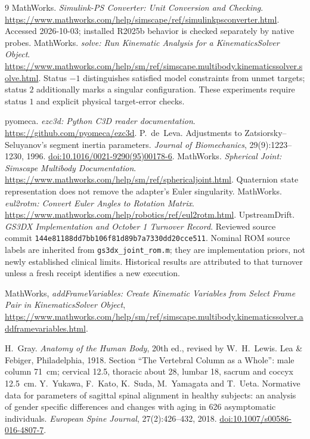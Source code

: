 \documentclass[11pt,a4paper]{article}
\begin{document}
\begin{thebibliography}{9}
MathWorks. \emph{Simulink-PS Converter: Unit Conversion and Checking}.
\url{https://www.mathworks.com/help/simscape/ref/simulinkpsconverter.html}.
Accessed 2026-10-03; installed R2025b behavior is checked separately by native probes.
MathWorks. \emph{solve: Run Kinematic Analysis for a KinematicsSolver Object}.
\url{https://www.mathworks.com/help/sm/ref/simscape.multibody.kinematicssolver.solve.html}.
Status $-1$ distinguishes satisfied model constraints from unmet targets;
status $2$ additionally marks a singular configuration. These experiments
require status $1$ and explicit physical target-error checks.

pyomeca. \emph{ezc3d: Python C3D reader documentation}.
\url{https://github.com/pyomeca/ezc3d}.
P.~de~Leva. Adjustments to Zatsiorsky--Seluyanov's segment inertia parameters.
\emph{Journal of Biomechanics}, 29(9):1223--1230, 1996.
\href{https://doi.org/10.1016/0021-9290(95)00178-6}{doi:10.1016/0021-9290(95)00178-6}.
MathWorks. \emph{Spherical Joint: Simscape Multibody Documentation}.
\url{https://www.mathworks.com/help/sm/ref/sphericaljoint.html}.
Quaternion state representation does not remove the adapter's Euler singularity.
MathWorks. \emph{eul2rotm: Convert Euler Angles to Rotation Matrix}.
\url{https://www.mathworks.com/help/robotics/ref/eul2rotm.html}.
UpstreamDrift. \emph{GS3DX Implementation and October 1 Turnover Record}.
Reviewed source commit \texttt{144e81188dd7bb106f81d89b7a7330dd20cce511}.
Nominal ROM source labels are inherited from \texttt{gs3dx\_joint\_rom.m};
they are implementation priors, not newly established clinical limits.
Historical results are attributed to that turnover unless a fresh receipt
identifies a new execution.

MathWorks, \emph{addFrameVariables: Create Kinematic Variables from Select
Frame Pair in KinematicsSolver Object},
\url{https://www.mathworks.com/help/sm/ref/simscape.multibody.kinematicssolver.addframevariables.html}.

H.~Gray. \emph{Anatomy of the Human Body}, 20th ed., revised by W.~H.~Lewis.
Lea \& Febiger, Philadelphia, 1918. Section ``The Vertebral Column as a
Whole'': male column 71~cm; cervical 12.5, thoracic about 28, lumbar 18,
sacrum and coccyx 12.5~cm.
Y.~Yukawa, F.~Kato, K.~Suda, M.~Yamagata and T.~Ueta. Normative data for
parameters of sagittal spinal alignment in healthy subjects: an analysis of
gender specific differences and changes with aging in 626 asymptomatic
individuals. \emph{European Spine Journal}, 27(2):426--432, 2018.
\href{https://doi.org/10.1007/s00586-016-4807-7}{doi:10.1007/s00586-016-4807-7}.

\end{thebibliography}
\end{document}
